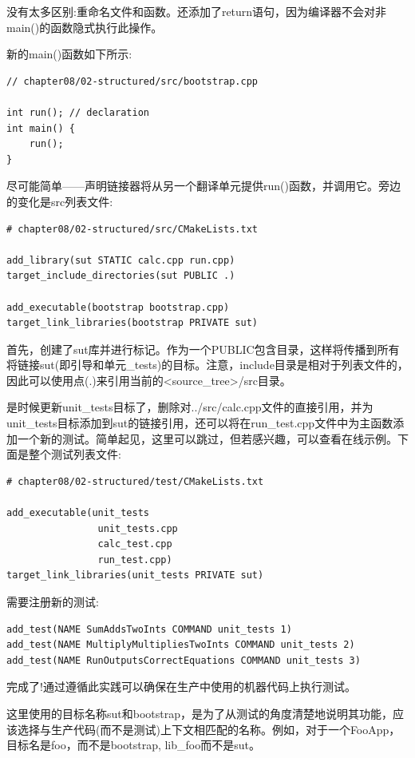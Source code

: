 没有太多区别:重命名文件和函数。还添加了return语句，因为编译器不会对非main()的函数隐式执行此操作。

新的main()函数如下所示:

\begin{lstlisting}[style=styleCXX]
// chapter08/02-structured/src/bootstrap.cpp

int run(); // declaration
int main() {
	run();
}
\end{lstlisting} 

尽可能简单——声明链接器将从另一个翻译单元提供run()函数，并调用它。旁边的变化是src列表文件:

\begin{lstlisting}[style=styleCMake]
# chapter08/02-structured/src/CMakeLists.txt

add_library(sut STATIC calc.cpp run.cpp)
target_include_directories(sut PUBLIC .)

add_executable(bootstrap bootstrap.cpp)
target_link_libraries(bootstrap PRIVATE sut)
\end{lstlisting} 

首先，创建了sut库并进行标记。作为一个PUBLIC包含目录，这样将传播到所有将链接sut(即引导和单元\_tests)的目标。注意，include目录是相对于列表文件的，因此可以使用点(.)来引用当前的<source\_tree>/src目录。

是时候更新unit\_tests目标了，删除对../src/calc.cpp文件的直接引用，并为unit\_tests目标添加到sut的链接引用，还可以将在run\_test.cpp文件中为主函数添加一个新的测试。简单起见，这里可以跳过，但若感兴趣，可以查看在线示例。下面是整个测试列表文件:

\begin{lstlisting}[style=styleCMake]
# chapter08/02-structured/test/CMakeLists.txt

add_executable(unit_tests
				unit_tests.cpp
				calc_test.cpp
				run_test.cpp)
target_link_libraries(unit_tests PRIVATE sut)
\end{lstlisting} 

需要注册新的测试:

\begin{lstlisting}[style=styleCMake]
add_test(NAME SumAddsTwoInts COMMAND unit_tests 1)
add_test(NAME MultiplyMultipliesTwoInts COMMAND unit_tests 2)
add_test(NAME RunOutputsCorrectEquations COMMAND unit_tests 3)
\end{lstlisting} 

完成了!通过遵循此实践可以确保在生产中使用的机器代码上执行测试。

\begin{tcolorbox}[colback=blue!5!white,colframe=blue!75!black,title=Note]
这里使用的目标名称sut和bootstrap，是为了从测试的角度清楚地说明其功能，应该选择与生产代码(而不是测试)上下文相匹配的名称。例如，对于一个FooApp，目标名是foo，而不是bootstrap, lib\_foo而不是sut。
\end{tcolorbox}

